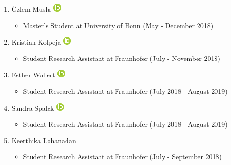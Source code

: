 \documentclass[10pt,a4paper,sans]{moderncv} %
\begin{document}
\begin{enumerate}
        \item     Özlem Muslu {\scriptsize     \href{https://orcid.org/0000-0003-0408-6190}{\includegraphics[scale=0.5]{img/ORCIDiD_icon16x16}}
}    \begin{itemize}
        \item {\scriptsize Master's Student at University of Bonn (May - December 2018)}
    \end{itemize}

        \item     Kristian Kolpeja {\scriptsize     \href{https://orcid.org/0000-0001-9661-5277}{\includegraphics[scale=0.5]{img/ORCIDiD_icon16x16}}
}    \begin{itemize}
        \item {\scriptsize Student Research Assistant at Fraunhofer (July - November 2018)}
    \end{itemize}

        \item     Esther Wollert {\scriptsize     \href{https://orcid.org/0000-0002-7128-929X}{\includegraphics[scale=0.5]{img/ORCIDiD_icon16x16}}
}    \begin{itemize}
        \item {\scriptsize Student Research Assistant at Fraunhofer (July 2018 - August 2019)}
    \end{itemize}

        \item     Sandra Spalek {\scriptsize     \href{https://orcid.org/0000-0002-6117-4413}{\includegraphics[scale=0.5]{img/ORCIDiD_icon16x16}}
}    \begin{itemize}
        \item {\scriptsize Student Research Assistant at Fraunhofer (July 2018 - August 2019)}
    \end{itemize}

        \item     Keerthika Lohanadan     \begin{itemize}
        \item {\scriptsize Student Research Assistant at Fraunhofer (July - September 2018)}
    \end{itemize}


\end{enumerate}
\end{document}
